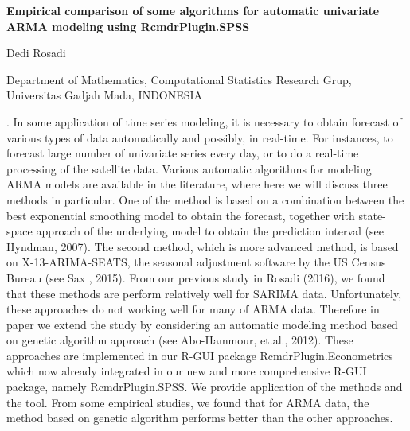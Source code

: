 \documentclass[12pt]{article}
\begin{document}
\begin{flushleft}


{\LARGE\bf  Empirical comparison of some algorithms for automatic univariate ARMA modeling using RcmdrPlugin.SPSS}


\vspace{1.0cm}

Dedi Rosadi %

\begin{description}

\item Department of Mathematics, Computational Statistics Research Grup, Universitas Gadjah Mada, INDONESIA


\end{description}

\end{flushleft}


\vspace{0.75cm}

. In some application of time series modeling, it is necessary to obtain forecast of various types of data automatically and possibly, in real-time. For instances, to forecast large number of univariate series every day, or to do a real-time processing of the satellite data. Various automatic algorithms for modeling ARMA models are available in the literature, where here we will discuss three methods in particular. One of the method is based on a combination between the best exponential smoothing model to obtain the forecast, together with state-space approach of the underlying model to obtain the prediction interval (see Hyndman, 2007). The second method, which is more advanced method, is based on X-13-ARIMA-SEATS, the seasonal adjustment software by the US Census Bureau (see Sax , 2015). From our previous study in Rosadi (2016), we found that these methods are perform relatively well for SARIMA data. Unfortunately, these approaches do not working well for many of ARMA data. Therefore in paper we extend the study by considering an automatic modeling method based on genetic algorithm approach (see Abo-Hammour, et.al., 2012). These approaches are implemented in our R-GUI package RcmdrPlugin.Econometrics which now already integrated in our new and more comprehensive R-GUI package, namely RcmdrPlugin.SPSS. We provide application of the methods and the tool. From some empirical studies, we found that for ARMA data, the method based on genetic algorithm performs better than the other approaches. 
\vskip 2mm
\end{document}
